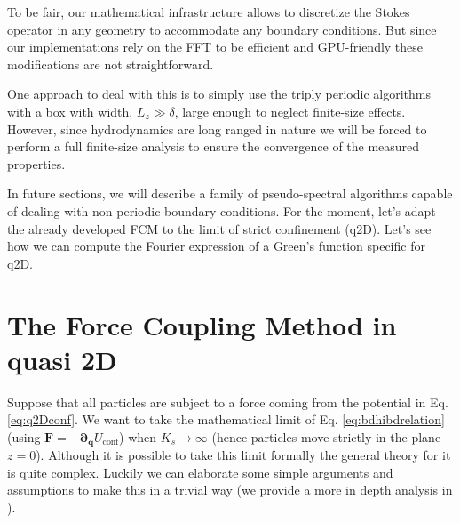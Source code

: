 \documentclass[twoside,openright,titlepage,numbers=noenddot,%
headinclude,footinclude,cleardoublepage=empty,abstract=on,
BCOR=5mm,fontsize=11pt, dvipsnames, paper=b5
]{scrreprt}
\renewcommand{\vec}[1]{\bm{#1}}
\newcommand{\tens}[1]{\bm{\mathcal{#1}}}
\newcommand{\gpu}{\gls{GPU}\xspace}
\newcommand{\ppos}{q}
\begin{document}
To be fair, our mathematical infrastructure allows to discretize the Stokes operator in any geometry to accommodate any boundary conditions. But since our implementations rely on the \gls{FFT} to be efficient and \gpu-friendly these modifications are not straightforward. 

One approach to deal with this is to simply use the triply periodic algorithms with a box with width, $L_z\gg \delta$, large enough to neglect finite-size effects. However, since hydrodynamics are long ranged in nature we will be forced to perform a full finite-size analysis to ensure the convergence of the measured properties.

In future sections, we will describe a family of pseudo-spectral algorithms capable of dealing with non periodic boundary conditions. For the moment, let's adapt the already developed \gls{FCM} to the limit of strict confinement (q2D). Let's see how we can compute the Fourier expression of a Green's function specific for q2D.

\section{The Force Coupling Method in quasi 2D}

Suppose that all particles are subject to a force coming from the potential in Eq. \eqref{eq:q2Dconf}. We want to take the mathematical limit of Eq. \eqref{eq:bdhibdrelation} (using $\vec{F} = -\vec{\partial}_{\vec{\ppos}} U_{\text{conf}}$) when $K_s\rightarrow\infty$ (hence particles move strictly in the plane $z=0$). Although it is possible to take this limit formally the general theory for it is quite complex. Luckily we can elaborate some simple arguments and assumptions to make this in a trivial way (we provide a more in depth analysis in \cite{Pelaez2018}).

%
\end{document}
